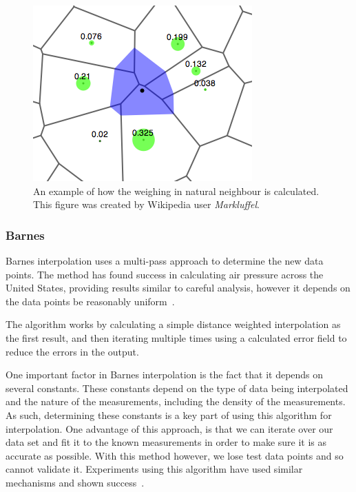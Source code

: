             \begin{figure}[H]
                \begin{center}
                    \includegraphics[scale=0.66]{./images/Natural_Neighbour.png}
                    \caption{An example of how the weighing in natural neighbour is calculated. This figure was created by Wikipedia user \emph{Markluffel}.}
                    \label{fig:natural_neighbour}
                \end{center}
            \end{figure}

        \subsubsection{Barnes}\label{background_interpolation_methods_barnes}

            Barnes interpolation uses a multi-pass approach to determine the new data points. The method has found success in calculating air pressure across the United States, providing results similar to careful analysis, however it depends on the data points be reasonably uniform~\cite{barnesinterpolation}.

            The algorithm works by calculating a simple distance weighted interpolation as the first result, and then iterating multiple times using a calculated error field to reduce the errors in the output. 

            One important factor in Barnes interpolation is the fact that it depends on several constants. These constants depend on the type of data being interpolated and the nature of the measurements, including the density of the measurements. As such, determining these constants is a key part of using this algorithm for interpolation. One advantage of this approach, is that we can iterate over our data set and fit it to the known measurements in order to make sure it is as accurate as possible. With this method however, we lose test data points and so cannot validate it. Experiments using this algorithm have used similar mechanisms and shown success~\cite{pmconcentrationmaps}.

